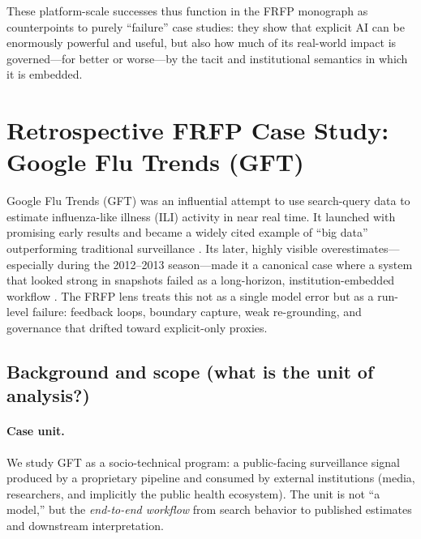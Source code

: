 These platform-scale successes thus function in the FRFP monograph as
counterpoints to purely “failure” case studies:
they show that explicit AI can be enormously powerful and useful, but also
how much of its real-world impact is governed---for better or worse---by the
tacit and institutional semantics in which it is embedded.

\section{Retrospective FRFP Case Study: Google Flu Trends (GFT)}
\label{sec:frfp-gft}

Google Flu Trends (GFT) was an influential attempt to use search-query data to estimate influenza-like illness (ILI) activity in near real time. It launched with promising early results and became a widely cited example of “big data” outperforming traditional surveillance \cite{Ginsberg2009Nature}. Its later, highly visible overestimates—especially during the 2012–2013 season—made it a canonical case where a system that looked strong in snapshots failed as a long-horizon, institution-embedded workflow \cite{Butler2013Nature,Lazer2014Science}. The FRFP lens treats this not as a single model error but as a run-level failure: feedback loops, boundary capture, weak re-grounding, and governance that drifted toward explicit-only proxies.

\subsection{Background and scope (what is the unit of analysis?)}

\paragraph{Case unit.}
We study GFT as a socio-technical program: a public-facing surveillance signal produced by a proprietary pipeline and consumed by external institutions (media, researchers, and implicitly the public health ecosystem). The unit is not “a model,” but the \emph{end-to-end workflow} from search behavior to published estimates and downstream interpretation.


